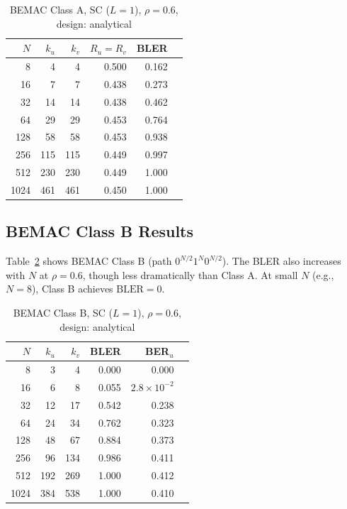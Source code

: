 \documentclass[11pt,a4paper]{article}
\begin{document}
\begin{table}[h]
\centering
\caption{BEMAC Class A, SC ($L = 1$), $\rho = 0.6$, design: analytical}
\label{tab:bemac_classA}
\begin{tabular}{rrrrrr}
\toprule
$N$ & $k_u$ & $k_v$ & $R_u = R_v$ & BLER \\
\midrule
   8 &   4 &   4 & 0.500 & 0.162 \\
  16 &   7 &   7 & 0.438 & 0.273 \\
  32 &  14 &  14 & 0.438 & 0.462 \\
  64 &  29 &  29 & 0.453 & 0.764 \\
 128 &  58 &  58 & 0.453 & 0.938 \\
 256 & 115 & 115 & 0.449 & 0.997 \\
 512 & 230 & 230 & 0.449 & 1.000 \\
1024 & 461 & 461 & 0.450 & 1.000 \\
\bottomrule
\end{tabular}
\end{table}

\subsection{BEMAC Class B Results}

Table~\ref{tab:bemac_classB} shows BEMAC Class B (path $0^{N/2} 1^N 0^{N/2}$).
The BLER also increases with $N$ at $\rho = 0.6$, though less dramatically
than Class A. At small $N$ (e.g., $N = 8$), Class B achieves $\text{BLER} = 0$.

\begin{table}[h]
\centering
\caption{BEMAC Class B, SC ($L = 1$), $\rho = 0.6$, design: analytical}
\label{tab:bemac_classB}
\begin{tabular}{rrrrrr}
\toprule
$N$ & $k_u$ & $k_v$ & BLER & BER$_u$ \\
\midrule
   8 &   3 &   4 & 0.000  & 0.000 \\
  16 &   6 &   8 & 0.055  & $2.8 \times 10^{-2}$ \\
  32 &  12 &  17 & 0.542  & 0.238 \\
  64 &  24 &  34 & 0.762  & 0.323 \\
 128 &  48 &  67 & 0.884  & 0.373 \\
 256 &  96 & 134 & 0.986  & 0.411 \\
 512 & 192 & 269 & 1.000  & 0.412 \\
1024 & 384 & 538 & 1.000  & 0.410 \\
\bottomrule
\end{tabular}
\end{table}
\end{document}
